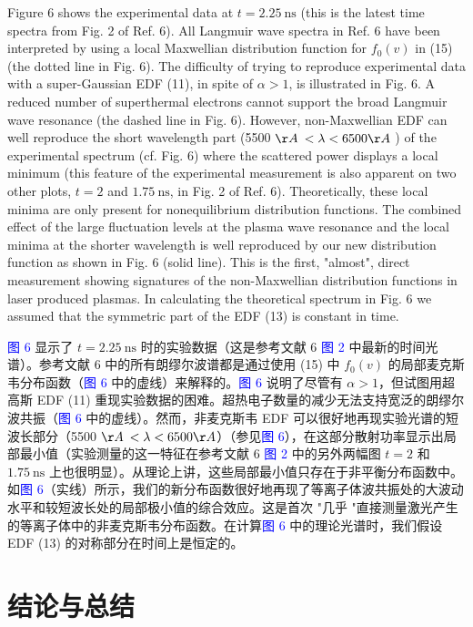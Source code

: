 \documentclass[oneside,onecolumn]{article}
\newcommand\enzhbox[2]{
  	\quad\par \begin{paracol}{2} \colseprulecolor{black} 
  			\begin{spacing}{1.0}
  				\footnotesize  #1
  			\end{spacing}
  		\switchcolumn[1] 
  		#2
  	\end{paracol} 
  }
\begin{document}
\begin{sloppypar}
 
\enzhbox{   Figure 6 shows the experimental data at $t=2.25 \mathrm{~ns}$ (this is the latest time spectra from Fig. 2 of Ref. 6). All Langmuir wave spectra in Ref. 6 have been interpreted by using a local Maxwellian distribution function for $f_{0}(v)$ in (15) (the dotted line in Fig. 6). The difficulty of trying to reproduce experimental data with a super-Gaussian EDF (11), in spite of $\alpha>1$, is illustrated in Fig. 6. A reduced number of superthermal electrons cannot support the broad Langmuir wave resonance (the dashed line in Fig. 6). However, non-Maxwellian EDF can well reproduce the short wavelength part (5500 $\AA$ $<\lambda<6500 \AA$ ) of the experimental spectrum (cf. Fig. 6) where the scattered power displays a local minimum (this feature of the experimental measurement is also apparent on two other plots, $t=2$ and $1.75 \mathrm{~ns}$, in Fig. 2 of Ref. 6). Theoretically, these local minima are only present for nonequilibrium distribution functions. The combined effect of the large fluctuation levels at the plasma wave resonance and the local minima at the shorter wavelength is well reproduced by our new distribution function as shown in Fig. 6 (solid line). This is the first, "almost", direct measurement showing signatures of the non-Maxwellian distribution functions in laser produced plasmas. In calculating the theoretical spectrum in Fig. 6 we assumed that the symmetric part of the EDF (13) is constant in time.
}{
\textcolor{blue}{图 6} 显示了 $t=2.25 \mathrm{~ns}$ 时的实验数据（这是参考文献 6 \textcolor{blue}{图 2} 中最新的时间光谱）。参考文献 6 中的所有朗缪尔波谱都是通过使用 (15) 中 $f_{0}(v)$ 的局部麦克斯韦分布函数（\textcolor{blue}{图 6} 中的虚线）来解释的。\textcolor{blue}{图 6} 说明了尽管有 $\alpha>1$，但试图用超高斯 EDF (11) 重现实验数据的困难。超热电子数量的减少无法支持宽泛的朗缪尔波共振（\textcolor{blue}{图 6} 中的虚线）。然而，非麦克斯韦 EDF 可以很好地再现实验光谱的短波长部分（5500 $\AA$ $<\lambda<6500 \AA$）（参见\textcolor{blue}{图 6}），在这部分散射功率显示出局部最小值（实验测量的这一特征在参考文献 6 \textcolor{blue}{图 2} 中的另外两幅图 $t=2$ 和 $1.75 \mathrm{~ns}$ 上也很明显）。从理论上讲，这些局部最小值只存在于非平衡分布函数中。如\textcolor{blue}{图 6}（实线）所示，我们的新分布函数很好地再现了等离子体波共振处的大波动水平和较短波长处的局部极小值的综合效应。这是首次 "几乎 "直接测量激光产生的等离子体中的非麦克斯韦分布函数。在计算\textcolor{blue}{图 6} 中的理论光谱时，我们假设 EDF (13) 的对称部分在时间上是恒定的。

}
  
  \section{结论与总结}


\end{sloppypar}
\end{document}
